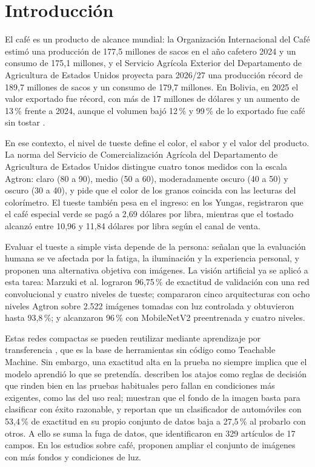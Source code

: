 \section{Introducción}
El café es un producto de alcance mundial: la Organización Internacional del Café \citeyearpar{ico2026} estimó una producción de 177,5 millones de sacos en el año cafetero 2024 y un consumo de 175,1 millones, y el Servicio Agrícola Exterior del Departamento de Agricultura de Estados Unidos \citeyearpar{usdafas2026} proyecta para 2026/27 una producción récord de 189,7 millones de sacos y un consumo de 179,7 millones. En Bolivia, en 2025 el valor exportado fue récord, con más de 17 millones de dólares y un aumento de 13\,\% frente a 2024, aunque el volumen bajó 12\,\% y 99\,\% de lo exportado fue café sin tostar \citep{ibce2026}.

En ese contexto, el nivel de tueste define el color, el sabor y el valor del producto. La norma del Servicio de Comercialización Agrícola del Departamento de Agricultura de Estados Unidos \citeyearpar{usdaams2004} distingue cuatro tonos medidos con la escala Agtron: claro (80 a 90), medio (50 a 60), moderadamente oscuro (40 a 50) y oscuro (30 a 40), y pide que el color de los granos coincida con las lecturas del colorímetro. El tueste también pesa en el ingreso: en los Yungas, \citet{jacobi2024} registraron que el café especial verde se pagó a 2,69 dólares por libra, mientras que el tostado alcanzó entre 10,96 y 11,84 dólares por libra según el canal de venta.

Evaluar el tueste a simple vista depende de la persona: \citet{marzuki2025} señalan que la evaluación humana se ve afectada por la fatiga, la iluminación y la experiencia personal, y proponen una alternativa objetiva con imágenes. La visión artificial ya se aplicó a esta tarea: Marzuki et al. lograron 96,75\,\% de exactitud de validación con una red convolucional y cuatro niveles de tueste; \citet{anto2025} compararon cinco arquitecturas con ocho niveles Agtron sobre 2.522 imágenes tomadas con luz controlada y obtuvieron hasta 93,8\,\%; y \citet{arsyan2026} alcanzaron 96\,\% con MobileNetV2 preentrenada y cuatro niveles.

Estas redes compactas se pueden reutilizar mediante aprendizaje por transferencia \citep{howard2017,sandler2018,yosinski2014}, que es la base de herramientas sin código como Teachable Machine. Sin embargo, una exactitud alta en la prueba no siempre implica que el modelo aprendió lo que se pretendía. \citet{geirhos2020} describen los atajos como reglas de decisión que rinden bien en las pruebas habituales pero fallan en condiciones más exigentes, como las del uso real; \citet{xiao2020} muestran que el fondo de la imagen basta para clasificar con éxito razonable, y \citet{torralba2011} reportan que un clasificador de automóviles con 53,4\,\% de exactitud en su propio conjunto de datos baja a 27,5\,\% al probarlo con otros. A ello se suma la fuga de datos, que \citet{kapoor2022} identificaron en 329 artículos de 17 campos. En los estudios sobre café, \citet{arsyan2026} proponen ampliar el conjunto de imágenes con más fondos y condiciones de luz.

